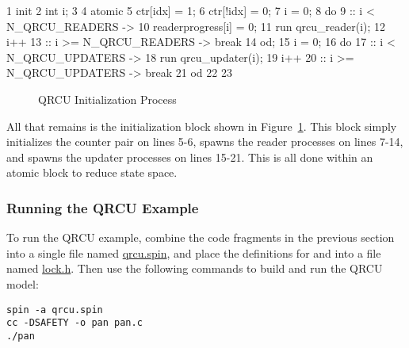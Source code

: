 { \scriptsize
\begin{verbbox}
  1 init {
  2   int i;
  3
  4   atomic {
  5     ctr[idx] = 1;
  6     ctr[!idx] = 0;
  7     i = 0;
  8     do
  9     :: i < N_QRCU_READERS ->
 10       readerprogress[i] = 0;
 11       run qrcu_reader(i);
 12       i++
 13     :: i >= N_QRCU_READERS -> break
 14     od;
 15     i = 0;
 16     do
 17     :: i < N_QRCU_UPDATERS ->
 18       run qrcu_updater(i);
 19       i++
 20     :: i >= N_QRCU_UPDATERS -> break
 21     od
 22   }
 23 }
\end{verbbox}
}
\begin{figure}[htbp]
\centering
\theverbbox
\caption{QRCU Initialization Process}
\label{fig:analysis:QRCU Initialization Process}
\end{figure}

All that remains is the initialization block shown in
Figure~\ref{fig:analysis:QRCU Initialization Process}.
This block simply initializes the counter pair on lines 5-6,
spawns the reader processes on lines 7-14, and spawns the updater
processes on lines 15-21.
This is all done within an atomic block to reduce state space.

\subsubsection{Running the QRCU Example}
\label{sec:formal:Running the QRCU Example}

To run the QRCU example, combine the code fragments in the previous
section into a single file named \url{qrcu.spin}, and place the definitions
for  and  into a file named
\url{lock.h}.
Then use the following commands to build and run the QRCU model:

\vspace{5pt}
\begin{minipage}[t]{\columnwidth}
\scriptsize
\begin{verbatim}
spin -a qrcu.spin
cc -DSAFETY -o pan pan.c
./pan
\end{verbatim}
\end{minipage}
\vspace{5pt}

